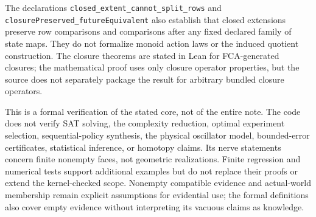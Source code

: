 \documentclass[11pt]{article}
\theoremstyle{definition}
\begin{document}
The declarations \texttt{closed\_extent\_cannot\_split\_rows} and
\texttt{closurePreserved\_futureEquivalent} also establish that closed
extensions preserve row comparisons and comparisons after any fixed
declared family of state maps. They do not formalize monoid action laws
or the induced quotient construction. The closure theorems are stated in
Lean for FCA-generated closures; the mathematical proof uses only closure
operator properties, but the source does not separately package the result
for arbitrary bundled closure operators.

This is a formal verification of the stated core, not of the entire note.
The code does not verify SAT solving, the complexity reduction, optimal
experiment selection, sequential-policy synthesis, the physical oscillator
model, bounded-error certificates, statistical inference, or homotopy
claims. Its nerve statements concern finite nonempty faces, not geometric
realizations. Finite regression and numerical tests support additional
examples but do not replace their proofs or extend the kernel-checked
scope. Nonempty compatible evidence and actual-world membership remain
explicit assumptions for evidential use; the formal definitions also
cover empty evidence without interpreting its vacuous claims as knowledge.
\end{document}
